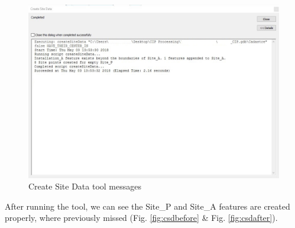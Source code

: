 \documentclass[openany]{book}
\theoremstyle{definition}
\theoremstyle{definition}
\theoremstyle{definition}
\theoremstyle{remark}
\begin{document}
\begin{figure}[H]

{\centering \includegraphics[width=5.07in,]{figures/csd-messages} 

}

\caption{Create Site Data tool messages}\label{fig:csdmessages}
\end{figure}

After running the tool, we can see the Site\_P and Site\_A features are
created properly, where previously missed (Fig. \ref{fig:csdbefore} \&
Fig. \ref{fig:csdafter}).
\end{document}
